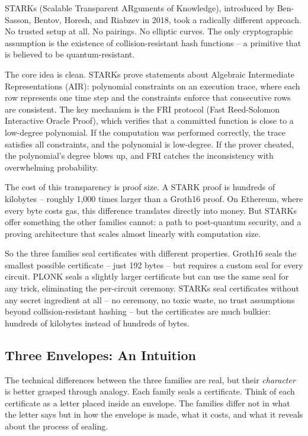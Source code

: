 \documentclass[
  11pt,
  openany]{report}
\begin{document}
STARKs (Scalable Transparent ARguments of Knowledge), introduced by Ben-Sasson,
Bentov, Horesh, and Riabzev in 2018, took a radically different approach. No
trusted setup at all. No pairings. No elliptic curves. The only cryptographic
assumption is the existence of collision-resistant hash functions -- a primitive
that is believed to be quantum-resistant.

The core idea is clean. STARKs prove statements about Algebraic Intermediate
Representations (AIR): polynomial constraints on an execution trace, where each
row represents one time step and the constraints enforce that consecutive rows
are consistent. The key mechanism is the FRI protocol (Fast Reed-Solomon
Interactive Oracle Proof), which verifies that a committed function is close to
a low-degree polynomial. If the computation was performed correctly, the trace
satisfies all constraints, and the polynomial is low-degree. If the prover
cheated, the polynomial's degree blows up, and FRI catches the inconsistency
with overwhelming probability.

The cost of this transparency is proof size. A STARK proof is hundreds of
kilobytes -- roughly 1,000 times larger than a Groth16 proof. On Ethereum, where
every byte costs gas, this difference translates directly into money. But STARKs
offer something the other families cannot: a path to post-quantum security, and
a proving architecture that scales almost linearly with computation size.

So the three families seal certificates with different properties. Groth16 seals
the smallest possible certificate -- just 192 bytes -- but requires a custom
seal for every circuit. PLONK seals a slightly larger certificate but can use
the same seal for any trick, eliminating the per-circuit ceremony. STARKs seal
certificates without any secret ingredient at all -- no ceremony, no toxic
waste, no trust assumptions beyond collision-resistant hashing -- but the
certificates are much bulkier: hundreds of kilobytes instead of hundreds of
bytes.

\subsection{Three Envelopes: An Intuition}\label{three-envelopes-an-intuition}

The technical differences between the three families are real, but their
\emph{character} is better grasped through analogy. Each family seals a
certificate. Think of each certificate as a letter placed inside an envelope.
The families differ not in what the letter says but in how the envelope is made,
what it costs, and what it reveals about the process of sealing.
\end{document}
